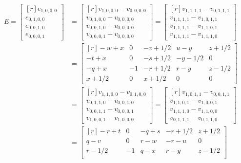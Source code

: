 \documentclass[12pt,titlepage]{article}
\numberwithin{equation}{section}
\begin{document}
\begin{align*}
E =
\begin{bmatrix*}[r]
e_{1,0,0,0} \\
e_{0,1,0,0} \\
e_{0,0,1,0} \\
e_{0,0,0,1}
\end{bmatrix*}
&=
\begin{bmatrix*}[r]
v_{1,0,0,0} - v_{0,0,0,0} \\
v_{0,1,0,0} - v_{0,0,0,0} \\
v_{0,0,1,0} - v_{0,0,0,0} \\
v_{0,0,0,1} - v_{0,0,0,0}
\end{bmatrix*}
= 
\begin{bmatrix*}[r]
v_{1,1,1,1} - v_{0,1,1,1} \\
v_{1,1,1,1} - v_{1,0,1,1} \\
v_{1,1,1,1} - v_{1,1,0,1} \\
v_{1,1,1,1} - v_{1,1,1,0}
\end{bmatrix*}
\\
&=
\begin{bmatrix*}[r]
-w + x   &  0 & -v + 1/2 &  u - y   & z + 1/2 \\
-t + x   &  0 & -s + 1/2 & -y - 1/2 &       0 \\
-q + x   & -1 & -r + 1/2 &  r - y   & z - 1/2 \\
 x + 1/2 &  0 &  x + 1/2 &        0 &       0
\end{bmatrix*}
\\
&= 
\begin{bmatrix*}[r]
v_{1,1,0,0} - v_{0,1,0,0} \\
v_{0,1,1,0} - v_{0,0,1,0} \\
v_{0,0,1,1} - v_{0,0,0,1} \\
v_{1,0,0,1} - v_{1,0,0,0}
\end{bmatrix*}
= 
\begin{bmatrix*}[r]
v_{1,0,1,1} - v_{0,0,1,1} \\
v_{1,1,0,1} - v_{1,0,0,1} \\
v_{1,1,1,0} - v_{1,1,0,0} \\
v_{0,1,1,1} - v_{0,1,1,0}
\end{bmatrix*}
\\
&=
\begin{bmatrix*}[r]
-r + t   &  0 & -q + s & -r + 1/2 & z + 1/2 \\
 q - v   &  0 &  r - w & -r - u   &       0 \\
 r - 1/2 & -1 &  q - x &  r - y   & z - 1/2 \\

\end{bmatrix*}
\end{align*}
\end{document}

